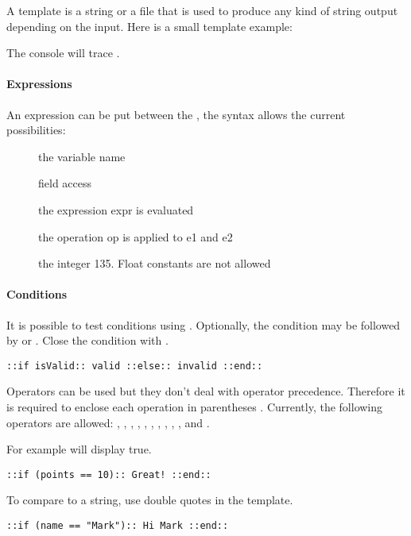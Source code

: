 A template is a string or a file that is used to produce any kind of string output depending on the input. Here is a small template example:


The console will trace .

\paragraph{Expressions}
An expression can be put between the \ic{::}, the syntax allows the current possibilities:

\begin{description}
	\item[] the variable name
	\item[] field access
	\item[] the expression expr is evaluated
	\item[] the operation op is applied to e1 and e2
	\item[] the integer 135. Float constants are not allowed
\end{description}

\paragraph{Conditions}
It is possible to test conditions using . Optionally, the condition may be followed by  or . Close the condition with .

\begin{lstlisting}
::if isValid:: valid ::else:: invalid ::end::
\end{lstlisting} 

Operators can be used but they don't deal with operator precedence. Therefore it is required to enclose each operation in parentheses \ic{()}. Currently, the following operators are allowed: \ic{+}, \ic{-}, \ic{*}, \ic{/}, \ic{>}, \ic{<},  \ic{>=}, \ic{<=}, \ic{==}, \ic{!=}, \ic{\&\&} and \ic{||}.

For example  will display true. 

\begin{lstlisting} 
::if (points == 10):: Great! ::end::
\end{lstlisting} 

To compare to a string, use double quotes  in the template.
\begin{lstlisting}
::if (name == "Mark"):: Hi Mark ::end::
\end{lstlisting} 

